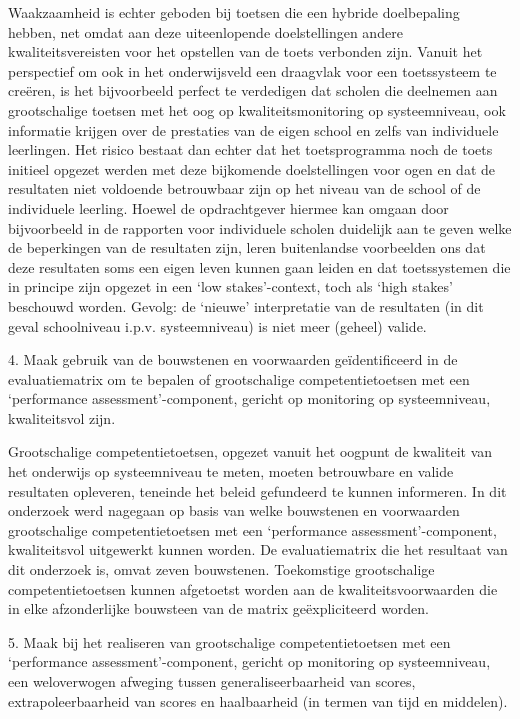 \documentclass[
  letterpaper,
]{report}
\begin{document}
Waakzaamheid is echter geboden bij toetsen die een hybride doelbepaling
hebben, net omdat aan deze uiteenlopende doelstellingen andere
kwaliteitsvereisten voor het opstellen van de toets verbonden zijn.
Vanuit het perspectief om ook in het onderwijsveld een draagvlak voor
een toetssysteem te creëren, is het bijvoorbeeld perfect te verdedigen
dat scholen die deelnemen aan grootschalige toetsen met het oog op
kwaliteitsmonitoring op systeemniveau, ook informatie krijgen over de
prestaties van de eigen school en zelfs van individuele leerlingen. Het
risico bestaat dan echter dat het toetsprogramma noch de toets initieel
opgezet werden met deze bijkomende doelstellingen voor ogen en dat de
resultaten niet voldoende betrouwbaar zijn op het niveau van de school
of de individuele leerling. Hoewel de opdrachtgever hiermee kan omgaan
door bijvoorbeeld in de rapporten voor individuele scholen duidelijk aan
te geven welke de beperkingen van de resultaten zijn, leren buitenlandse
voorbeelden ons dat deze resultaten soms een eigen leven kunnen gaan
leiden en dat toetssystemen die in principe zijn opgezet in een `low
stakes'-context, toch als `high stakes' beschouwd worden. Gevolg: de
`nieuwe' interpretatie van de resultaten (in dit geval schoolniveau
i.p.v. systeemniveau) is niet meer (geheel) valide.

{ 4. Maak gebruik van de bouwstenen en voorwaarden geïdentificeerd in de
evaluatiematrix om te bepalen of grootschalige competentietoetsen met
een `performance assessment'-component, gericht op monitoring op
systeemniveau, kwaliteitsvol zijn. }

Grootschalige competentietoetsen, opgezet vanuit het oogpunt de
kwaliteit van het onderwijs op systeemniveau te meten, moeten
betrouwbare en valide resultaten opleveren, teneinde het beleid
gefundeerd te kunnen informeren. In dit onderzoek werd nagegaan op basis
van welke bouwstenen en voorwaarden grootschalige competentietoetsen met
een `performance assessment'-component, kwaliteitsvol uitgewerkt kunnen
worden. De evaluatiematrix die het resultaat van dit onderzoek is, omvat
zeven bouwstenen. Toekomstige grootschalige competentietoetsen kunnen
afgetoetst worden aan de kwaliteitsvoorwaarden die in elke afzonderlijke
bouwsteen van de matrix geëxpliciteerd worden.

{ 5. Maak bij het realiseren van grootschalige competentietoetsen met
een `performance assessment'-component, gericht op monitoring op
systeemniveau, een weloverwogen afweging tussen generaliseerbaarheid van
scores, extrapoleerbaarheid van scores en haalbaarheid (in termen van
tijd en middelen). }
\end{document}
